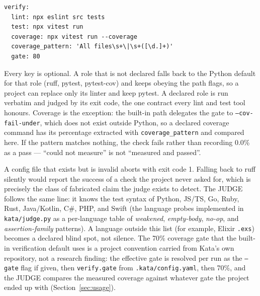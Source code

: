 \documentclass[11pt]{article}
\begin{document}
\begin{lstlisting}[caption=Declaring the verification commands of a non-Python project.]
verify:
  lint: npx eslint src tests
  test: npx vitest run
  coverage: npx vitest run --coverage
  coverage_pattern: 'All files\s+\|\s+([\d.]+)'
  gate: 80
\end{lstlisting}

Every key is optional. A role that is not declared falls back to the
Python default for that role (ruff, pytest, pytest-cov) and keeps obeying
the path flags, so a project can replace only its linter and keep pytest.
A declared role is run verbatim and judged by its exit code, the one
contract every lint and test tool honours. Coverage is the exception: the
built-in path delegates the gate to \texttt{--cov-fail-under}, which does
not exist outside Python, so a declared coverage command has its percentage
extracted with \texttt{coverage\_pattern} and compared here. If the
pattern matches nothing, the check fails rather than recording 0.0\% as a
pass --- ``could not measure'' is not ``measured and passed''.

A config file that exists but is invalid aborts with exit code 1. Falling
back to ruff silently would report the success of a check the project
never asked for, which is precisely the class of fabricated claim the judge exists to detect. The
JUDGE follows the same line: it knows the test syntax of Python, JS/TS,
Go, Ruby, Rust, Java/Kotlin, C\#, PHP, and Swift (the language probes
implemented in \texttt{kata/judge.py} as a per-language table of
\emph{weakened}, \emph{empty-body}, \emph{no-op}, and
\emph{assertion-family} patterns). A language outside this
list (for example, Elixir \texttt{.exs}) becomes a declared blind spot,
not silence. The 70\% coverage gate that the built-in verification default
uses is a project convention carried from Kata's own repository, not a
research finding: the effective gate is resolved per run as the
\texttt{--gate} flag if given, then \texttt{verify.gate} from
\texttt{.kata/config.yaml}, then 70\%,
and the JUDGE compares the measured coverage against whatever gate the
project ended up with (Section~\ref{sec:usage}).
\end{document}
